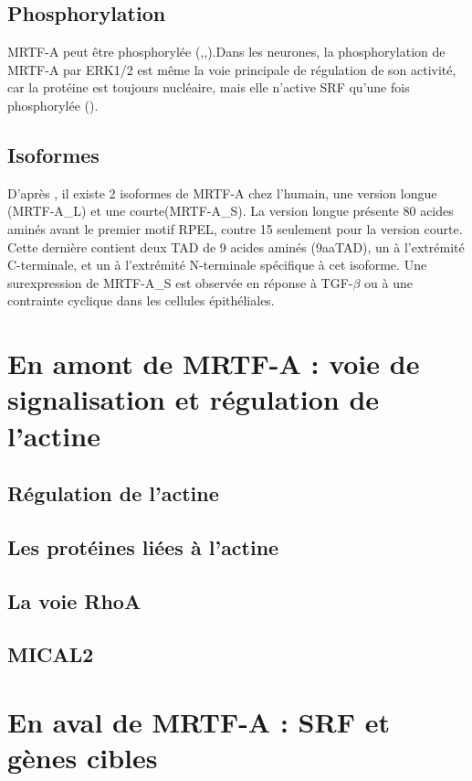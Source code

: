 \documentclass{report}
\begin{document}
 \subsection{Phosphorylation}
	MRTF-A peut être phosphorylée (\cite{miralles_actin_2003},\cite{cen_myocardin/mkl_2004},).Dans les neurones, la phosphorylation de MRTF-A par ERK1/2 est même la voie principale de régulation de son activité, car la protéine est toujours nucléaire, mais elle n'active SRF qu'une fois phosphorylée (\cite{kalita_role_2006}).
	
 \subsection{Isoformes}
 D'après \cite{scharenberg_tgf-_2014}, il existe 2 isoformes de MRTF-A chez l'humain, une version longue (MRTF-A\_L) et une courte(MRTF-A\_S). La version longue présente 80 acides aminés avant le premier motif RPEL, contre 15 seulement pour la version courte. Cette dernière contient deux TAD de 9 acides aminés (9aaTAD), un à l'extrémité C-terminale, et un à l'extrémité N-terminale spécifique à cet isoforme. Une surexpression de MRTF-A\_S est observée en réponse à TGF-$\beta$ ou à une contrainte cyclique dans les cellules épithéliales. 
 
 

\section{En amont de MRTF-A : voie de signalisation et régulation de l'actine} 
\subsection{Régulation de l'actine}
\subsection{Les protéines liées à l'actine}
\subsection{La voie RhoA}
\subsection{MICAL2}

\section{En aval de MRTF-A : SRF et gènes cibles}

\printbibliography
\end{document}
